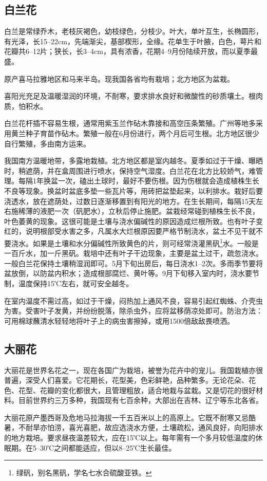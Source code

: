 \documentclass{ctexbook}
\begin{document}
\subsection{白兰花}
白兰是常绿乔木，老枝灰褐色，幼枝绿色，分枝少。叶大，单叶互生，长椭圆形，有光泽，长15--22cm，先端渐尖，基部楔形，全缘。花单生于叶腋，白色，萼片和花瓣共6--12片；狭长，长3--4cm，具有浓香，花期4--9月份陆续开放，而以夏季最盛。

原产喜马拉雅地区和马来半岛。现我国各省均有栽培；北方地区为盆栽。

喜阳光充足及温暖湿润的环境，不耐寒，要求排水良好和微酸性的砂质壤土。根肉质，怕积水。

白兰花杆插不容易生根，通常用紫玉兰作砧木靠接和高空压条繁殖。广州等地多采用黄兰种子育苗作砧木。繁殖一般在6月份进行，两个月后可生根。北方地区很少自行繁殖，多由南方运来。

我国南方温暖地带，多露地栽植。北方地区都是室内越冬。夏季如过于干燥、曝晒时，稍遮荫，并在盒周围进行喷水，保持空气湿度。白兰花在北方比较娇气，难管理。每隔1年换盆一次，磕出土球时，最好不要伤根。因为伤根就会造成植株生长不良等现象。换盆时盆底多垫一些瓦片等，用砖把盆垫起来，以利排水。栽好后要浇透水，放在遮荫处，过数日逐渐移置到有阳光的地方。在生长期间，每隔15天左右施稀薄的液肥一次（矾肥水），立秋后停止施肥。盆栽经常碰到植株生长不良，叶色萎黄的现象。这很可能是土壤与浇水偏碱性的原因造成烂根所致。也有叶子变红的，说明根部受水害之多，凡属水大烂根原因要严格节制浇水，盆土不见干就不要浇水。如果是土壤和水分偏碱性所致黄色的片，则可经常浇灌黑矾\footnote{绿矾，别名黑矾，学名七水合硫酸亚铁。}水。一般是一百斤水，加一斤黑矾。栽培中还有叶子干边现象，主要是盆土过干，疏忽浇水。一般白兰花保持土壤稍湿润即可。5月下旬出房后，每日浇水1--2次。多雨季节要将盆放倒，以防盆内积水；造成根部腐烂、黄叶等。9月下旬移入室内时，浇水要节制，温度保持15℃左右，就可安全越冬。

在室内温度不需过高，如过于干燥，闷热加上通风不良，容易引起红蜘蛛、介壳虫为害。受害叶子发黄，并纷纷脱落，除杀虫外，应将盆移荫凉处即可。防治方法：可用棉球蘸清水轻轻地将叶子上的病虫害擦掉，或用1500倍敌敌畏喷洒。
\subsection{大丽花}
大丽花是世界名花之一，现在各国广为栽培，被誉为花卉中的宠儿。我国栽植亦很普遍，深受人们喜爱。它花期长，花型美，色彩鲜艳，品种繁多。无论花朵、花色、花型、花瓣的变化都很大，且管理粗放，适合地栽与盆栽。又是切花的很好材料。目前世界约三万多种，我国现有七百余种，大部出在吉林、辽宁等东北各省。

大丽花原产墨西哥及危地马拉海拔一千五百米以上的高原上。它既不耐寒又忌酷暑，不耐旱亦怕涝，喜光喜肥，故应选浇水方便，土壤疏松，通风良好，向阳排水的地方栽培。要求昼夜温差较大，应在15℃以上。每年需有一个多月较低温度的休眠期。在5--30℃之间都能适应，但以8--25℃生长最佳。
\end{document}
